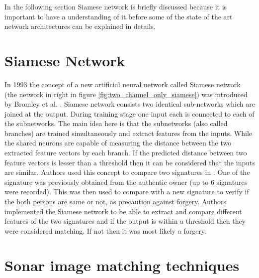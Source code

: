 In the following section Siamese network is briefly discussed because it is important to have a understanding of it before some of the state of the art network architectures can be explained in details. 

\section{Siamese Network}
In 1993 the concept of a new artificial neural network called Siamese network (the network in right in figure \ref{fig:two_channel_only_siamese}) was introduced by Bromley et al. \cite{bromley1994signature}. Siamese network consists two identical sub-networks which are joined at the output.
During training stage one input each is connected to each of the subnetworks. The main idea here is that the subnetworks (also called branches) are trained simultaneously and extract features from the inputs.
While the shared neurons are capable of measuring the distance between the two extracted feature vectors by each branch. If the predicted distance between two feature vectors is lesser than a threshold then it can be considered 
that the inputs are similar. Authors used this concept to compare two signatures in \cite{bromley1994signature}. One of the signature was previously obtained from the authentic owner (up to 6 signatures were recorded). This was then used to compare with a new signature
to verify if the both persons are same or not, as precaution against forgery. Authors implemented the Siamese network to be able to extract and compare different features of the two signatures and if the output is within a threshold then
they were considered matching. If not then it was most likely a forgery. 

\section{Sonar image matching techniques}

